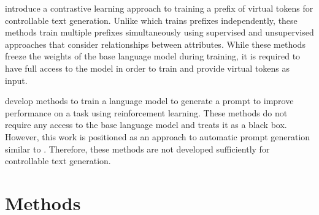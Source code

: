 \documentclass[phd,electronic,oneside,twosidetoc,letterpaper,chaptercenter,parttop,lof]{byumsphd}
\begin{document}
\citet{qian-etal-2022-controllable} introduce a contrastive learning approach to training a prefix of virtual tokens for controllable text generation.
Unlike \cite{li2021prefix} which trains prefixes independently, these methods train multiple prefixes simultaneously using supervised and unsupervised approaches that consider relationships between attributes. 
While these methods freeze the weights of the base language model during training, it is required to have full access to the model in order to train and provide virtual tokens as input.

\citet{deng-etal-2022-rlprompt} develop methods to train a language model to generate a prompt to improve performance on a task using reinforcement learning.
These methods do not require any access to the base language model and treats it as a black box.
However, this work is positioned as an approach to automatic prompt generation similar to \citet{shin2020autoprompt}. 
Therefore, these methods are not developed sufficiently for controllable text generation.


\section{Methods}
\label{methods}

\end{document}
